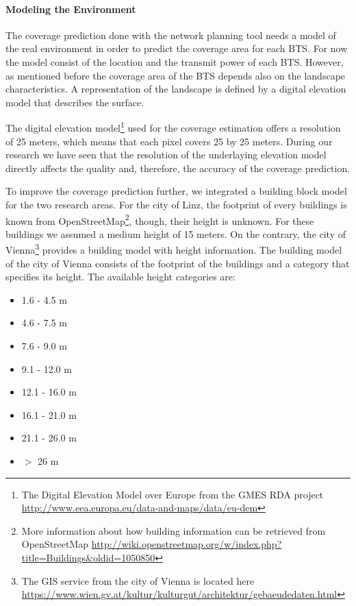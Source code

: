 \paragraph{Modeling the Environment}
The coverage prediction done with the network planning tool needs a model of the real environment in order to predict the coverage area for each BTS. For now the model consist of the location and the transmit power of each BTS. However, as mentioned before the coverage area of the BTS depends also on the landscape characteristics. A representation of the landscape is defined by a digital elevation model that describes the surface. 

The digital elevation model\footnote{The Digital Elevation Model over Europe from the GMES RDA project \url{http://www.eea.europa.eu/data-and-maps/data/eu-dem}} used for the coverage estimation offers a resolution of 25 meters, which means that each pixel covers 25 by 25 meters. During our research we have seen that the resolution of the underlaying elevation model directly affects the quality and, therefore, the accuracy of the coverage prediction.

To improve the coverage prediction further, we integrated a building block model for the two research areas. For the city of Linz, the footprint of every buildings is known from OpenStreetMap\footnote{More information about how building information can be retrieved from OpenStreetMap \url{http://wiki.openstreetmap.org/w/index.php?title=Buildings&oldid=1050850}}, though, their height is unknown. For these buildings we assumed a medium height of 15 meters. On the contrary, the city of Vienna\footnote{The GIS service from the city of Vienna is located here \url{https://www.wien.gv.at/kultur/kulturgut/architektur/gebaeudedaten.html}} provides a building model with height information. The building model of the city of Vienna consists of the footprint of the buildings and a category that specifies its height. The available height categories are: 
\begin{itemize}
	\item 1.6 - 4.5 m
	\item 4.6 - 7.5 m
	\item 7.6 - 9.0 m
	\item 9.1 - 12.0 m
	\item 12.1 - 16.0 m
	\item 16.1 - 21.0 m
	\item 21.1 - 26.0 m
	\item $>$ 26 m
\end{itemize}

